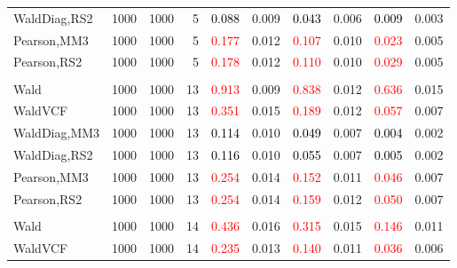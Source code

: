 \documentclass[
]{article}
\begin{document}
\begin{table}[H]
{\begin{tabular}[t]{lrrrrrrlrr}
\hspace{1em}WaldDiag,RS2 & 1000 & 1000 & 5 & \textcolor{black}{0.088} & 0.009 & \textcolor{black}{0.043} & 0.006 & \textcolor{black}{0.009} & 0.003\\
\hspace{1em}Pearson,MM3 & 1000 & 1000 & 5 & \textcolor{red}{0.177} & 0.012 & \textcolor{red}{0.107} & 0.010 & \textcolor{red}{0.023} & 0.005\\
\hspace{1em}Pearson,RS2 & 1000 & 1000 & 5 & \textcolor{red}{0.178} & 0.012 & \textcolor{red}{0.110} & 0.010 & \textcolor{red}{0.029} & 0.005\\
\addlinespace[0.3em]
\multicolumn{10}{l}{\textbf{1F 15V}}\\
\hspace{1em}Wald & 1000 & 1000 & 13 & \textcolor{red}{0.913} & 0.009 & \textcolor{red}{0.838} & 0.012 & \textcolor{red}{0.636} & 0.015\\
\hspace{1em}WaldVCF & 1000 & 1000 & 13 & \textcolor{red}{0.351} & 0.015 & \textcolor{red}{0.189} & 0.012 & \textcolor{red}{0.057} & 0.007\\
\hspace{1em}WaldDiag,MM3 & 1000 & 1000 & 13 & \textcolor{black}{0.114} & 0.010 & \textcolor{black}{0.049} & 0.007 & \textcolor{black}{0.004} & 0.002\\
\hspace{1em}WaldDiag,RS2 & 1000 & 1000 & 13 & \textcolor{black}{0.116} & 0.010 & \textcolor{black}{0.055} & 0.007 & \textcolor{black}{0.005} & 0.002\\
\hspace{1em}Pearson,MM3 & 1000 & 1000 & 13 & \textcolor{red}{0.254} & 0.014 & \textcolor{red}{0.152} & 0.011 & \textcolor{red}{0.046} & 0.007\\
\hspace{1em}Pearson,RS2 & 1000 & 1000 & 13 & \textcolor{red}{0.254} & 0.014 & \textcolor{red}{0.159} & 0.012 & \textcolor{red}{0.050} & 0.007\\
\addlinespace[0.3em]
\multicolumn{10}{l}{\textbf{2F 10V}}\\
\hspace{1em}Wald & 1000 & 1000 & 14 & \textcolor{red}{0.436} & 0.016 & \textcolor{red}{0.315} & 0.015 & \textcolor{red}{0.146} & 0.011\\
\hspace{1em}WaldVCF & 1000 & 1000 & 14 & \textcolor{red}{0.235} & 0.013 & \textcolor{red}{0.140} & 0.011 & \textcolor{red}{0.036} & 0.006\\

\end{tabular}}
\end{table}
\end{document}
